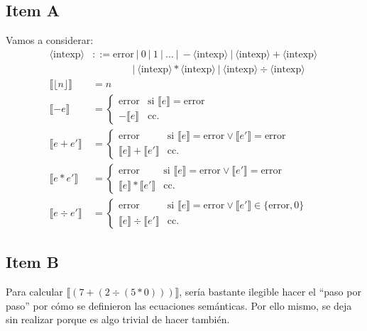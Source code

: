 \documentclass{article}
\newcommand{\aexp}[1]{\langle\text{#1}\rangle}
\newcommand{\intexp}{\aexp{intexp}}
\newcommand{\sem}[1]{\llbracket #1\rrbracket}
\begin{document}
\subsection*{Item A}
Vamos a considerar:
\begin{equation*}
	\begin{aligned}
		\intexp                & ::= \text{error}\ |\ 0\ |\ 1\ |\ \dots\ |\ -\intexp\ |\ \intexp + \intexp\                     \\
		                       & \qquad\qquad |\ \intexp * \intexp\ |\ \intexp \div \intexp                                     \\
		\sem{\lfloor n\rfloor} & = n                                                                                            \\
		\sem{-e}               & = \begin{cases}
			                           \text{error} & \text{si }\sem{e}=\text{error} \\
			                           -\sem{e}     & \text{cc.}
		                           \end{cases}                                                \\
		\sem{e+e'}             & =\begin{cases}
			                          \text{error}       & \text{si }\sem{e}=\text{error}\lor\sem{e'}=\text{error} \\
			                          \sem{e} + \sem{e'} & \text{cc.}
		                          \end{cases}                  \\
		\sem{e*e'}             & =\begin{cases}
			                          \text{error}       & \text{si }\sem{e} = \text{error} \lor \sem{e'} = \text{error} \\
			                          \sem{e} * \sem{e'} & \text{cc.}
		                          \end{cases}            \\
		\sem{e \div e'}        & = \begin{cases}
			                           \text{error}          & \text{si }\sem{e} = \text{error} \lor \sem{e'}\in\{\text{error}, 0\} \\
			                           \sem{e} \div \sem{e'} & \text{cc.}
		                           \end{cases}
	\end{aligned}
\end{equation*}

\subsection*{Item B}
Para calcular $\sem{(7+(2 \div (5*0)))}$, sería bastante ilegible hacer el ``paso por paso'' por cómo se definieron las ecuaciones semánticas.
Por ello mismo, se deja sin realizar porque es algo trivial de hacer también.
\end{document}

